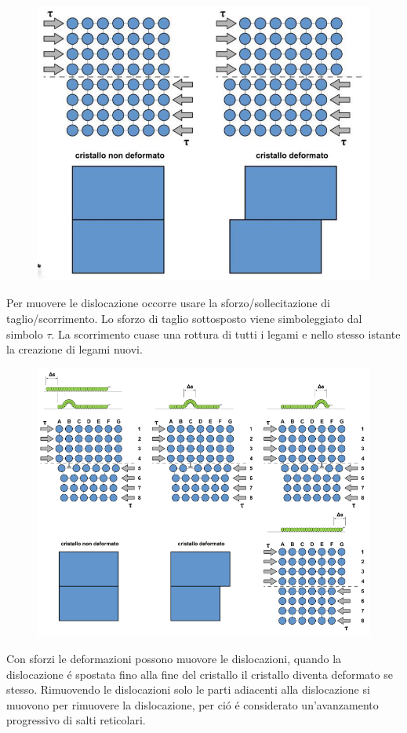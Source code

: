 \documentclass{article}
\begin{document}
                \begin{figure}[h!]
                    \centering
                    \includegraphics[width=.85\linewidth]{Deformazione di Dislocazione.png}
                \end{figure}
                Per muovere le dislocazione occorre usare la sforzo/sollecitazione di taglio/scorrimento. Lo sforzo di taglio sottosposto viene simboleggiato dal simbolo $\tau$. La scorrimento cuase una rottura di tutti i legami e nello stesso istante la creazione di legami nuovi. \\
                \begin{figure}[h!]
                    \centering
                    \includegraphics[width=.85\linewidth]{Scorrimento di Dislocazione.png}
                \end{figure}
                Con sforzi le deformazioni possono muovore le dislocazioni, quando la dislocazione \'e spostata fino alla fine del cristallo il cristallo diventa deformato se stesso. Rimuovendo le dislocazioni solo le parti adiacenti alla dislocazione si muovono per rimuovere la dislocazione, per ci\'o \'e considerato un'avanzamento progressivo di salti reticolari.\\ \\
\end{document}
